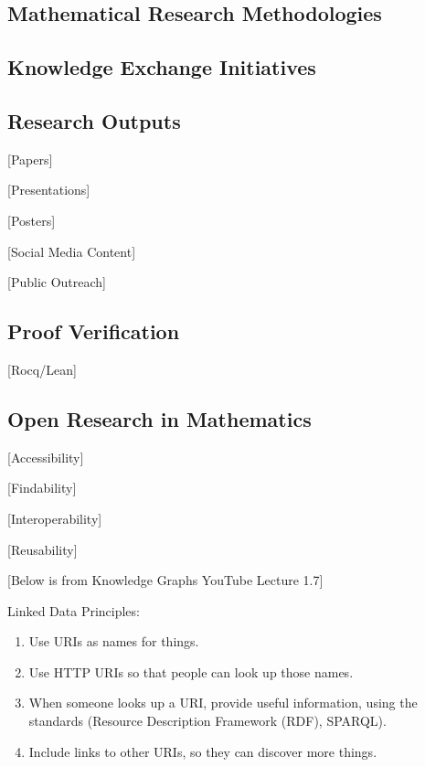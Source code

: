 \documentclass[
  british,
]{article}
\providecommand{\tightlist}{%
  \setlength{\itemsep}{0pt}\setlength{\parskip}{0pt}}
\begin{document}
\subsection{Mathematical Research
Methodologies}\label{mathematical-research-methodologies}

\subsection{Knowledge Exchange
Initiatives}\label{knowledge-exchange-initiatives}

\subsection{Research Outputs}\label{research-outputs}

{[}Papers{]}

{[}Presentations{]}

{[}Posters{]}

{[}Social Media Content{]}

{[}Public Outreach{]}

\subsection{Proof Verification}\label{proof-verification}

{[}Rocq/Lean{]}

\subsection{Open Research in
Mathematics}\label{open-research-in-mathematics}

{[}Accessibility{]}

{[}Findability{]}

{[}Interoperability{]}

{[}Reusability{]}

{[}Below is from Knowledge Graphs YouTube Lecture 1.7{]}

Linked Data Principles:

\begin{enumerate}
\def\labelenumi{\arabic{enumi}.}
\tightlist
\item
  Use URIs as names for things.
\item
  Use HTTP URIs so that people can look up those names.
\item
  When someone looks up a URI, provide useful information, using the
  standards (Resource Description Framework (RDF), SPARQL).
\item
  Include links to other URIs, so they can discover more things.
\end{enumerate}
\end{document}
